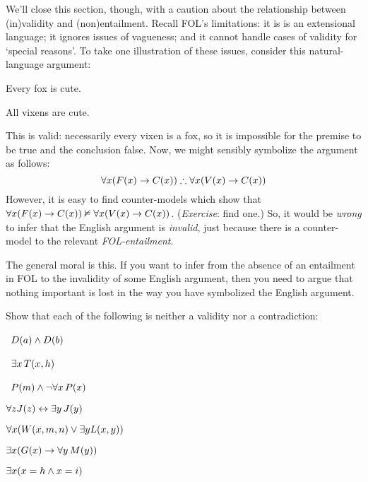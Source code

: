We'll close this section, though, with a caution about the relationship between (in)validity and (non)entailment. Recall FOL's limitations: it is is an extensional language; it ignores issues of vagueness; and it cannot handle cases of validity for `special reasons'. To take one illustration of these issues, consider this natural-language argument: 
\begin{earg}
	\item[] Every fox is cute.
	\item[\therefore] All vixens are cute.
\end{earg}
This is valid: necessarily every vixen is a fox, so it is impossible for the premise to be true and the conclusion false. Now, we might sensibly symbolize the argument as follows:
$$\forall x(\atom{F}{x} \eif \atom{C}{x}) \therefore \forall x(\atom{V}{x} \eif  \atom{C}{x})$$
However, it is easy to find counter-models which show that $\forall x(\mathord{F}(x) \rightarrow \mathord{C}(x)) \nvDash \forall x(\mathord{V}(x) \rightarrow  \mathord{C}(x))$. (\emph{Exercise}: find one.) So, it would be \emph{wrong} to infer that the English argument is \emph{invalid}, just because there is a counter-model to the relevant \emph{FOL-entailment}. 

The general moral is this. If you want to infer from the absence of an entailment in FOL to the invalidity of some English argument, then you need to argue that nothing important is lost in the way you have symbolized the English argument. 

\practiceproblems

\solutions
\problempart
\label{pr.Contingent}
Show that each of the following is neither a validity nor a contradiction:
\begin{earg}
\item \leftsolutions\ $\mathord{D}(a)  \wedge \mathord{D}(b)$
\item \leftsolutions\ $\exists x\, \mathord{T}(x,h)$
\item \leftsolutions\ $\mathord{P}(m)  \wedge \neg\forall x\, \mathord{P}(x)$
\item $\forall z \mathord{J}(z) \leftrightarrow \exists y\, \mathord{J}(y)$
\item $\forall x (\mathord{W}(x,m,n) \vee \exists y\mathord{L}(x,y))$
\item $\exists x (\mathord{G}(x) \rightarrow \forall y\, \mathord{M}(y))$
\item $\exists x (x = h \wedge x = i)$
\end{earg}

